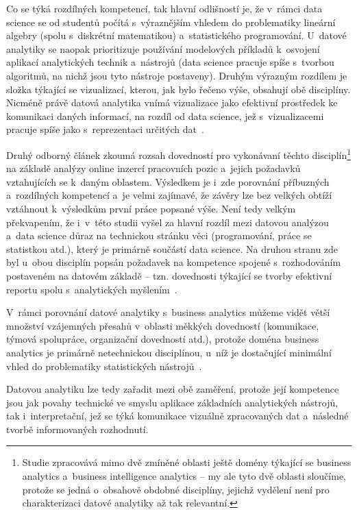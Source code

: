 Co se týká rozdílných kompetencí, tak hlavní odlišností je, že v~rámci data science se od studentů počítá s~výraznějším vhledem do problematiky lineární algebry (spolu s~diskrétní matematikou) a~statistického programování. U~datové analytiky se naopak prioritizuje používání modelových příkladů k~osvojení aplikací analytických technik a~nástrojů (data science pracuje spíše s~tvorbou algoritmů, na nichž jsou tyto nástroje postaveny). Druhým výrazným rozdílem je složka týkající se vizualizací, kterou, jak bylo řečeno výše, obsahují obě disciplíny. Nicméně právě datová analytika vnímá vizualizace jako efektivní prostředek ke komunikaci daných informací, na rozdíl od data science, jež s~vizualizacemi pracuje spíše jako s~reprezentaci určitých dat~\parencite[110]{aasheim2015}.

Druhý odborný článek zkoumá rozsah dovedností pro vykonávaní těchto disciplín\footnote{Studie zpracovává mimo dvě zmíněné oblasti ještě domény týkající se business analytics a~business intelligence analytics – my ale tyto dvě oblasti sloučíme, protože se jedná o~obsahově obdobné disciplíny, jejichž vydělení není pro charakterizaci datové analytiky až tak relevantní.} na základě analýzy online inzercí pracovních pozic a~jejich požadavků vztahujících se k~daným oblastem. Výsledkem je i~zde porovnání příbuzných a~rozdílných kompetencí a~je velmi zajímavé, že závěry lze bez velkých obtíží vztáhnout k~výsledkům první práce popsané výše. Není tedy velkým překvapením, že i~v~této studii vyšel za hlavní rozdíl mezi datovou analýzou a~data science důraz na technickou stránku věci (programování, práce se statistkou atd.), který je primárně součástí data science. Na druhou stranu zde byl u~obou disciplín popsán požadavek na kompetence spojené s~rozhodováním postaveném na datovém základě -- tzn. dovednosti týkající se tvorby efektivní reportu spolu s~analytických myšlením~\parencite[248]{verma19}.

V~rámci porovnání datové analytiky s~business analytics můžeme vidět větší množství vzájemných přesahů v~oblasti měkkých dovedností (komunikace, týmová spolupráce, organizační dovedností atd.), protože doména business analytics je primárně netechnickou disciplínou, u~níž je dostačující minimální vhled do problematiky statistických nástrojů~\parencite[249]{verma19}.

Datovou analytiku lze tedy zařadit mezi obě zaměření, protože její kompetence jsou jak povahy technické ve smyslu aplikace základních analytických nástrojů, tak i~interpretační, jež se týká komunikace vizuálně zpracovaných dat a~následné tvorbě informovaných rozhodnutí.

